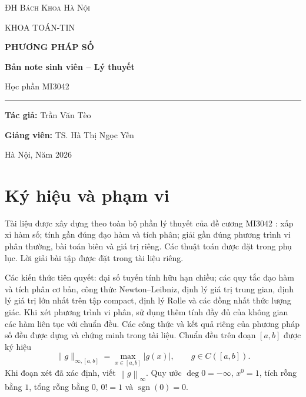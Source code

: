 \documentclass[12pt,a4paper,oneside]{book}
\numberwithin{algorithm}{chapter}
\theoremstyle{definition}
\newcommand{\norminf}[1]{\left\lVert #1\right\rVert_{\infty}}
\begin{document}
\hypersetup{pageanchor=false}
\begin{titlepage}
\centering
\vspace*{1.5cm}
{\scshape\Large ĐH Bách Khoa Hà Nội\par}
{\large KHOA TOÁN-TIN\par}
\vspace{2.5cm}
{\Huge\bfseries\color{mainblue} PHƯƠNG PHÁP SỐ\par}
\vspace{0.6cm}
{\LARGE\bfseries Bản note sinh viên -- Lý thuyết\par}
\vspace{1cm}
{\large Học phần MI3042\par}
\vspace{1cm}
\rule{0.6\textwidth}{1.5pt}\par
\vspace{1.5cm}
{\Large\textbf{Tác giả:} Trần Văn Tèo\par}
{\large\textbf{Giảng viên:} TS. Hà Thị Ngọc Yến\par}
\vfill
{\large Hà Nội, Năm 2026\par}
\end{titlepage}

\frontmatter
\hypersetup{pageanchor=true}
\chapter*{Ký hiệu và phạm vi}
Tài liệu được xây dựng theo toàn bộ phần lý thuyết của đề cương MI3042 \cite{outline}: xấp xỉ hàm số; tính gần đúng đạo hàm và tích phân; giải gần đúng phương trình vi phân thường, bài toán biên và giá trị riêng. Các thuật toán được đặt trong phụ lục. Lời giải bài tập được đặt trong tài liệu riêng.

Các kiến thức tiên quyết: đại số tuyến tính hữu hạn chiều; các quy tắc đạo hàm và tích phân cơ bản, công thức Newton--Leibniz, định lý giá trị trung gian, định lý giá trị lớn nhất trên tập compact, định lý Rolle và các đồng nhất thức lượng giác. Khi xét phương trình vi phân, sử dụng thêm tính đầy đủ của không gian các hàm liên tục với chuẩn đều. Các công thức và kết quả riêng của phương pháp số đều được dựng và chứng minh trong tài liệu. Chuẩn đều trên đoạn $[a,b]$ được ký hiệu
\[
 \lVert g\rVert_{\infty,[a,b]}=\max_{x\in[a,b]}|g(x)|,
 \qquad g\in C([a,b]).
\]
Khi đoạn xét đã xác định, viết $\norminf{g}$. Quy ước $\deg0=-\infty$, $x^0=1$, tích rỗng bằng $1$, tổng rỗng bằng $0$, $0!=1$ và $\operatorname{sgn}(0)=0$.
\end{document}
